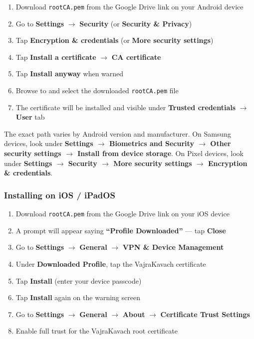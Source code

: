 \documentclass[12pt,a4paper]{article}
\begin{document}
\begin{enumerate}
  \item Download \texttt{rootCA.pem} from the Google Drive link on your Android device
  \item Go to \textbf{Settings} $\rightarrow$ \textbf{Security} (or \textbf{Security \& Privacy})
  \item Tap \textbf{Encryption \& credentials} (or \textbf{More security settings})
  \item Tap \textbf{Install a certificate} $\rightarrow$ \textbf{CA certificate}
  \item Tap \textbf{Install anyway} when warned
  \item Browse to and select the downloaded \texttt{rootCA.pem} file
  \item The certificate will be installed and visible under \textbf{Trusted credentials} $\rightarrow$ \textbf{User} tab
\end{enumerate}

\begin{warnbox}
The exact path varies by Android version and manufacturer. On Samsung devices, look under \textbf{Settings $\rightarrow$ Biometrics and Security $\rightarrow$ Other security settings $\rightarrow$ Install from device storage}. On Pixel devices, look under \textbf{Settings $\rightarrow$ Security $\rightarrow$ More security settings $\rightarrow$ Encryption \& credentials}.
\end{warnbox}


\subsubsection{Installing on iOS / iPadOS}

\begin{enumerate}
  \item Download \texttt{rootCA.pem} from the Google Drive link on your iOS device
  \item A prompt will appear saying \textbf{``Profile Downloaded''} --- tap \textbf{Close}
  \item Go to \textbf{Settings} $\rightarrow$ \textbf{General} $\rightarrow$ \textbf{VPN \& Device Management}
  \item Under \textbf{Downloaded Profile}, tap the VajraKavach certificate
  \item Tap \textbf{Install} (enter your device passcode)
  \item Tap \textbf{Install} again on the warning screen
  \item Go to \textbf{Settings} $\rightarrow$ \textbf{General} $\rightarrow$ \textbf{About} $\rightarrow$ \textbf{Certificate Trust Settings}
  \item Enable full trust for the VajraKavach root certificate
\end{enumerate}
\end{document}
